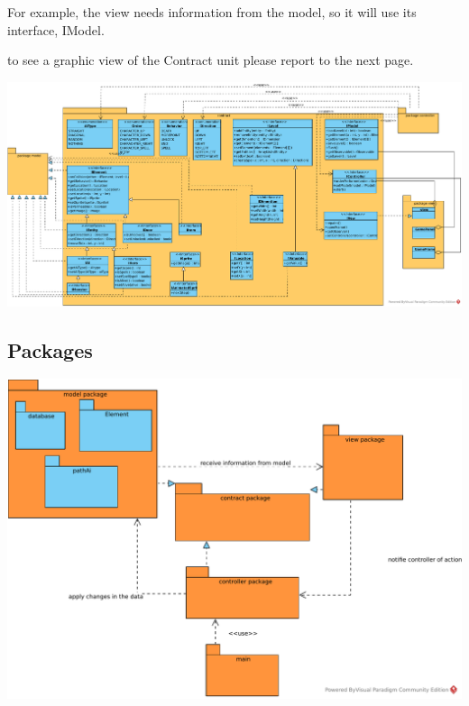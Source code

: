 \documentclass{report}
\begin{document}
For example, the view needs information from the model, so it will use its interface, IModel.

to see a graphic view of the Contract unit please report to the next page.

\begin{landscape}

\vspace*{\fill}

\includegraphics[scale=0.56]{resources/SVG/contract.pdf}

\vspace*{\fill}

\end{landscape}

\subsection{Packages}

\begin{center}
\includegraphics[scale=0.8]{resources/SVG/package.pdf}
\end{center}
\end{document}
